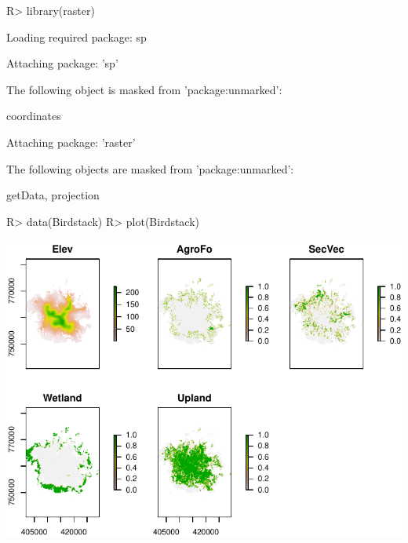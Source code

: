 \documentclass[article]{jss}
\begin{document}
\begin{CodeChunk}

\begin{CodeInput}
R> library(raster)
\end{CodeInput}

\begin{CodeOutput}
Loading required package: sp
\end{CodeOutput}

\begin{CodeOutput}

Attaching package: 'sp'
\end{CodeOutput}

\begin{CodeOutput}
The following object is masked from 'package:unmarked':

    coordinates
\end{CodeOutput}

\begin{CodeOutput}

Attaching package: 'raster'
\end{CodeOutput}

\begin{CodeOutput}
The following objects are masked from 'package:unmarked':

    getData, projection
\end{CodeOutput}

\begin{CodeInput}
R> data(Birdstack)
R> plot(Birdstack)
\end{CodeInput}


\begin{center}\includegraphics{diversityocc_files/figure-latex/unnamed-chunk-22-1} \end{center}



\end{CodeChunk}
\end{document}
